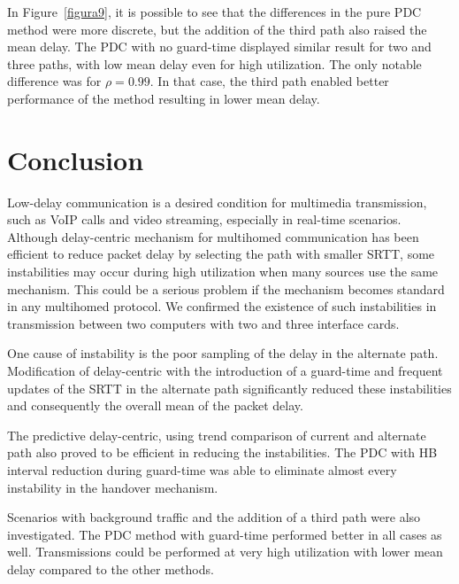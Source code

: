 \documentclass{sbrt2015}
\begin{document}
In Figure~\ref{figura9}, it is possible to see that the differences in the pure PDC method were more discrete, but the addition of the third path also raised the mean delay. The PDC with no guard-time displayed similar result for two and three paths, with low mean delay even for high utilization. 
The only notable difference was for $\rho = 0.99$. In that case, the third path enabled better performance of the method resulting in lower mean delay.


\section{Conclusion}

Low-delay communication is a desired condition for multimedia transmission, such as VoIP calls and video streaming, especially in real-time scenarios. Although delay-centric mechanism for multihomed communication has been efficient to reduce packet delay by selecting the path with smaller SRTT, some instabilities may occur during high utilization when many sources use the same mechanism. This could be a serious problem if the mechanism becomes standard in any multihomed protocol. We confirmed the existence of such instabilities in transmission between two computers with two and three interface cards.

One cause of instability is the poor sampling of the delay in the alternate path. Modification of delay-centric with the introduction of a guard-time and frequent updates of the SRTT in the alternate path significantly reduced these instabilities and consequently the overall mean of the packet delay.

The predictive delay-centric, using trend comparison of current and alternate path also proved to be efficient in reducing the instabilities. The PDC with HB interval reduction during guard-time was able to eliminate almost every instability in the handover mechanism. 

Scenarios with background traffic and the addition of a third path were also investigated. The PDC method with guard-time performed better in all cases as well. Transmissions could be performed at very high utilization with lower mean delay compared to the other methods.





\end{document}
